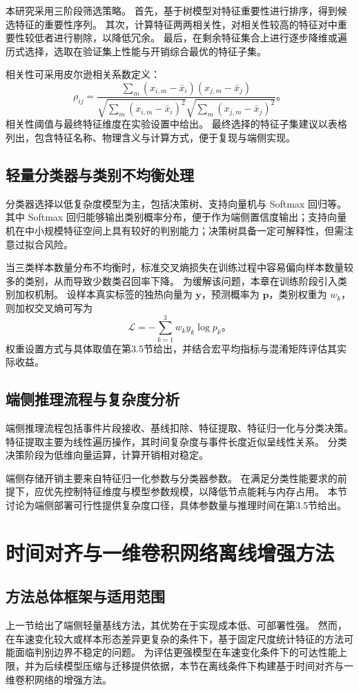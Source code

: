 \documentclass{xdupgthesis}
\begin{document}
本研究采用三阶段筛选策略。
首先，基于树模型对特征重要性进行排序，得到候选特征的重要性序列。
其次，计算特征两两相关性，对相关性较高的特征对中重要性较低者进行剔除，以降低冗余。
最后，在剩余特征集合上进行逐步降维或遍历式选择，选取在验证集上性能与开销综合最优的特征子集。

相关性可采用皮尔逊相关系数定义：
\[
\rho_{ij}=\frac{\sum_{m}(x_{i,m}-\bar{x}_i)(x_{j,m}-\bar{x}_j)}
{\sqrt{\sum_{m}(x_{i,m}-\bar{x}_i)^2}\sqrt{\sum_{m}(x_{j,m}-\bar{x}_j)^2}}。
\]
相关性阈值与最终特征维度在实验设置中给出。
最终选择的特征子集建议以表格列出，包含特征名称、物理含义与计算方式，便于复现与端侧实现。

\subsection{轻量分类器与类别不均衡处理}
分类器选择以低复杂度模型为主，包括决策树、支持向量机与 Softmax 回归等。
其中 Softmax 回归能够输出类别概率分布，便于作为端侧置信度输出；支持向量机在中小规模特征空间上具有较好的判别能力；决策树具备一定可解释性，但需注意过拟合风险。

当三类样本数量分布不均衡时，标准交叉熵损失在训练过程中容易偏向样本数量较多的类别，从而导致少数类召回率下降。
为缓解该问题，本章在训练阶段引入类别加权机制。
设样本真实标签的独热向量为 $\mathbf{y}$，预测概率为 $\mathbf{p}$，类别权重为 $w_k$，则加权交叉熵可写为
\[
\mathcal{L}=-\sum_{k=1}^{3} w_k y_k \log p_k 。
\]
权重设置方式与具体取值在第3.5节给出，并结合宏平均指标与混淆矩阵评估其实际收益。

\subsection{端侧推理流程与复杂度分析}
端侧推理流程包括事件片段接收、基线扣除、特征提取、特征归一化与分类决策。
特征提取主要为线性遍历操作，其时间复杂度与事件长度近似呈线性关系。
分类决策阶段为低维向量运算，计算开销相对稳定。

端侧存储开销主要来自特征归一化参数与分类器参数。
在满足分类性能要求的前提下，应优先控制特征维度与模型参数规模，以降低节点能耗与内存占用。
本节讨论为端侧部署可行性提供复杂度口径，具体参数量与推理时间在第3.5节给出。




\section{时间对齐与一维卷积网络离线增强方法}

\subsection{方法总体框架与适用范围}
上一节给出了端侧轻量基线方法，其优势在于实现成本低、可部署性强。
然而，在车速变化较大或样本形态差异更复杂的条件下，基于固定尺度统计特征的方法可能面临判别边界不稳定的问题。
为评估更强模型在车速变化条件下的可达性能上限，并为后续模型压缩与迁移提供依据，本节在离线条件下构建基于时间对齐与一维卷积网络的增强方法。
\end{document}
